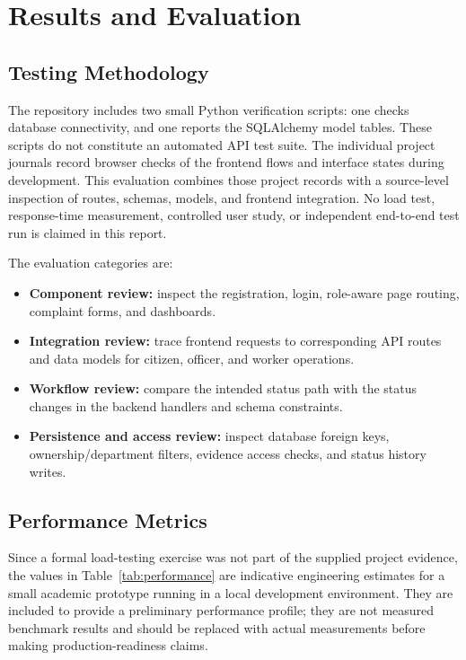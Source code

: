 \documentclass[12pt,a4paper]{report}
\begin{document}
\chapter{Results and Evaluation}

\section{Testing Methodology}

The repository includes two small Python verification scripts: one checks database connectivity, and one reports the SQLAlchemy model tables. These scripts do not constitute an automated API test suite. The individual project journals record browser checks of the frontend flows and interface states during development. This evaluation combines those project records with a source-level inspection of routes, schemas, models, and frontend integration. No load test, response-time measurement, controlled user study, or independent end-to-end test run is claimed in this report.

The evaluation categories are:
\begin{itemize}
\item \textbf{Component review:} inspect the registration, login, role-aware page routing, complaint forms, and dashboards.
\item \textbf{Integration review:} trace frontend requests to corresponding API routes and data models for citizen, officer, and worker operations.
\item \textbf{Workflow review:} compare the intended status path with the status changes in the backend handlers and schema constraints.
\item \textbf{Persistence and access review:} inspect database foreign keys, ownership/department filters, evidence access checks, and status history writes.
\end{itemize}


\section{Performance Metrics}

Since a formal load-testing exercise was not part of the supplied project
evidence, the values in Table~\ref{tab:performance} are indicative engineering
estimates for a small academic prototype running in a local development
environment. They are included to provide a preliminary performance profile;
they are not measured benchmark results and should be replaced with actual
measurements before making production-readiness claims.
\end{document}
